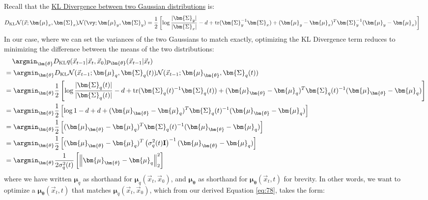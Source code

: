 Recall that the \href{https://en.wikipedia.org/wiki/Kullback\%E2\%80\%93Leibler_divergence#Multivariate_normal_distributions}{KL Divergence between two Gaussian distributions} is:
\begin{align}
D_{\rm{KL}}{\mathcal{N}(\vec{x}; \bm{\mu}_x,\bm{\Sigma}_x)}{\mathcal{N}(\vy; \bm{\mu}_y,\bm{\Sigma}_y)}
&=\frac{1}{2}\left[\log\frac{|\bm{\Sigma}_y|}{|\bm{\Sigma}_x|} - d + \text{tr}(\bm{\Sigma}_y^{-1}\bm{\Sigma}_x)
+ (\bm{\mu}_y-\bm{\mu}_x)^T \bm{\Sigma}_y^{-1} (\bm{\mu}_y-\bm{\mu}_x)\right]
\end{align}
In our case, where we can set the variances of the two Gaussians to match exactly, optimizing the KL Divergence term reduces to minimizing the difference between the means of the two distributions:
\begin{align}
& \quad \,\argmin_{\bm{\theta}} D_{\rm{KL}}{q(\vec{x}_{t-1}|\vec{x}_t, \vec{x}_0)}{p_{\bm{\theta}}(\vec{x}_{t-1}|\vec{x}_t)} \nonumber \\
&= \argmin_{\bm{\theta}}D_{\rm{KL}}{\mathcal{N}(\vec{x}_{t-1}; \bm{\mu}_q,\bm{\Sigma}_q(t))}{\mathcal{N}(\vec{x}_{t-1}; \bm{\mu}_{\bm{\theta}},\bm{\Sigma}_q(t))}\\
&=\argmin_{\bm{\theta}}\frac{1}{2}\left[\log\frac{|\bm{\Sigma}_q(t)|}{|\bm{\Sigma}_q(t)|} - d + \text{tr}(\bm{\Sigma}_q(t)^{-1}\bm{\Sigma}_q(t))
+ (\bm{\mu}_{\bm{\theta}}-\bm{\mu}_q)^T \bm{\Sigma}_q(t)^{-1} (\bm{\mu}_{\bm{\theta}}-\bm{\mu}_q)\right]\\
&=\argmin_{\bm{\theta}}\frac{1}{2}\left[\log1 - d + d + (\bm{\mu}_{\bm{\theta}}-\bm{\mu}_q)^T \bm{\Sigma}_q(t)^{-1} (\bm{\mu}_{\bm{\theta}}-\bm{\mu}_q)\right]\\
&=\argmin_{\bm{\theta}}\frac{1}{2}\left[(\bm{\mu}_{\bm{\theta}}-\bm{\mu}_q)^T \bm{\Sigma}_q(t)^{-1} (\bm{\mu}_{\bm{\theta}}-\bm{\mu}_q)\right]\\
&=\argmin_{\bm{\theta}}\frac{1}{2}\left[(\bm{\mu}_{\bm{\theta}}-\bm{\mu}_q)^T \left(\sigma_q^2(t)\textbf{I}\right)^{-1} (\bm{\mu}_{\bm{\theta}}-\bm{\mu}_q)\right]\\
&=\argmin_{\bm{\theta}}\frac{1}{2\sigma_q^2(t)}\left[\left\lVert\bm{\mu}_{\bm{\theta}}-\bm{\mu}_q\right\rVert_2^2\right]
\end{align}
where we have written $\bm{\mu}_q$ as shorthand for $\bm{\mu}_q(\vec{x}_t, \vec{x}_0)$, and $\bm{\mu}_{\bm{\theta}}$ as shorthand for $\bm{\mu}_{\bm{\theta}}(\vec{x}_t, t)$ for brevity.  In other words, we want to optimize a $\bm{\mu}_{\bm{\theta}}(\vec{x}_t, t)$ that matches $\bm{\mu}_q(\vec{x}_t, \vec{x}_0)$, which from our derived Equation \ref{eq:78}, takes the form: 
